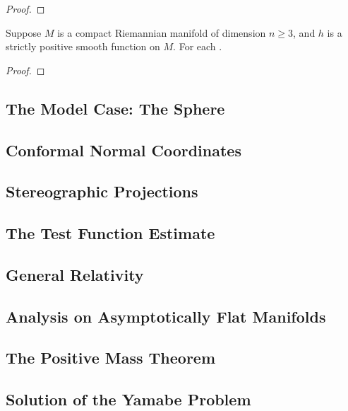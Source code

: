 \begin{computational-work}\leavevmode
  \label{cw:weak_removable_singularities}
\end{computational-work}

\begin{proof}
\end{proof}

\begin{theorem}
  \label{thm:green_function}

  Suppose $M$ is a compact Riemannian manifold of dimension $n \ge 3$, and $h$ is a strictly positive smooth function on $M$. For each .
\end{theorem}

\begin{computational-work}\leavevmode
  \label{cw:green_function}
\end{computational-work}

\begin{proof}
\end{proof}

\subsection{The Model Case: The Sphere}

\subsection{Conformal Normal Coordinates}

\subsection{Stereographic Projections}

\subsection{The Test Function Estimate}

\subsection{General Relativity}

\subsection{Analysis on Asymptotically Flat Manifolds}

\subsection{The Positive Mass Theorem}

\subsection{Solution of the Yamabe Problem}

